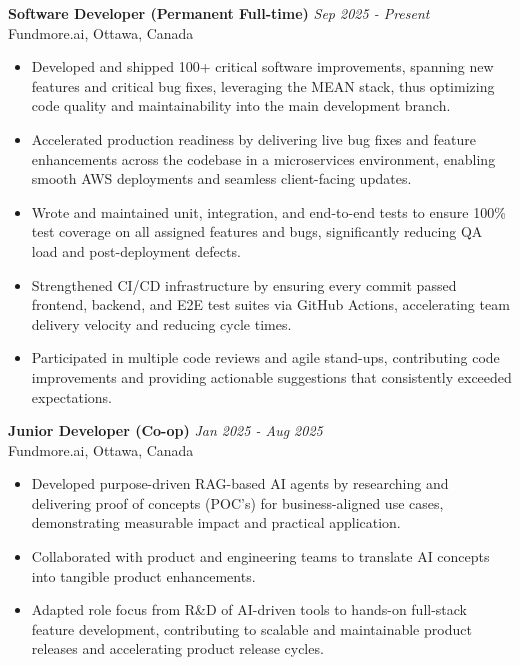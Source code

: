 \documentclass[10pt, letterpaper]{article}
\begin{document}
\textbf{Software Developer (Permanent Full-time)} \hfill \textit{Sep 2025 - Present} \\
Fundmore.ai, Ottawa, Canada \\
\begin{itemize}
\vspace{-0.3cm}
    \item Developed and shipped 100+ critical software improvements, spanning new features and critical bug fixes, leveraging the MEAN stack, thus optimizing code quality and maintainability into the main development branch.
    \item Accelerated production readiness by delivering live bug fixes and feature enhancements across the codebase in a microservices environment, enabling smooth AWS deployments and seamless client-facing updates.
    \item Wrote and maintained unit, integration, and end-to-end tests to ensure 100\% test coverage on all assigned features and bugs, significantly reducing QA load and post-deployment defects.
    \item Strengthened CI/CD infrastructure by ensuring every commit passed frontend, backend, and E2E test suites via GitHub Actions, accelerating team delivery velocity and reducing cycle times.
    \item Participated in multiple code reviews and agile stand-ups, contributing code improvements and providing actionable suggestions that consistently exceeded expectations.
\end{itemize}

\vspace{0.2cm}

\textbf{Junior Developer (Co-op)} \hfill \textit{Jan 2025 - Aug 2025} \\
Fundmore.ai, Ottawa, Canada \\
\begin{itemize}
\vspace{-0.3cm}
    \item Developed purpose-driven RAG-based AI agents by researching and delivering proof of concepts (POC's) for business-aligned use cases, demonstrating measurable impact and practical application.
    \item Collaborated with product and engineering teams to translate AI concepts into tangible product enhancements.
    \item Adapted role focus from R\&D of AI-driven tools to hands-on full-stack feature development, contributing to scalable and maintainable product releases and accelerating product release cycles.
\end{itemize}
\end{document}
